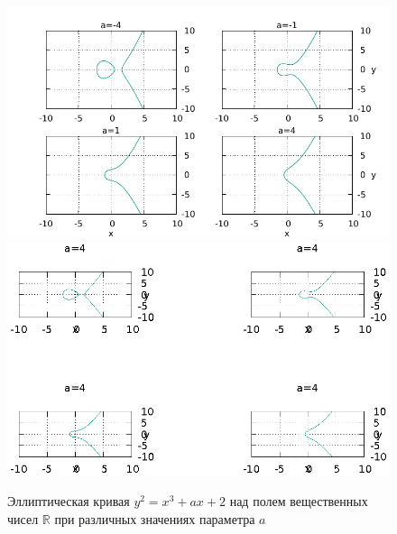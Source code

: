 \begin{figure}
\centering
\ifpdf
\includegraphics[angle=0]
{./add/discretmath/picelliptic.pdf}
\else
\includegraphics[angle=0]
{./add/discretmath/picelliptic.eps}
\fi
\caption{Эллиптическая кривая $y^2 = x^3 + a x + 2$ над полем
  вещественных чисел $\mathbb{R}$ при различных значениях параметра $a$}
\label{fig:add:ellipticR}
\end{figure}
